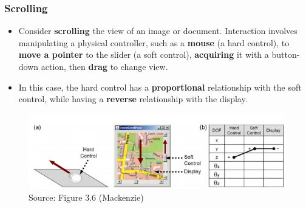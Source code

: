 \documentclass{beamer}
\begin{document}

\begin{frame}
	\frametitle{Scrolling}
	\begin{itemize}
		\item Consider \textbf{scrolling} the view of an image or document. Interaction involves manipulating a physical controller, such as a \textbf{mouse} (a hard control), to \textbf{move a pointer} to the slider (a soft control), \textbf{acquiring} it with a button-down action, then \textbf{drag} to change view.
		\item In this case, the hard control has a \textbf{proportional} relationship with the soft control, while having a \textbf{reverse} relationship with the display.
	\end{itemize}
	\begin{figure}
		\includegraphics[width=0.7\linewidth]{image/3-6}
		\caption{Source: Figure 3.6 (Mackenzie)}
	\end{figure}
\end{frame}
\end{document}
